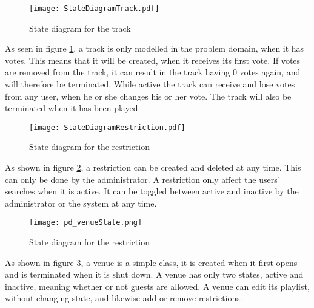\begin{figure}[H]
  \centering
  \texttt{[image: StateDiagramTrack.pdf]}
  \caption{State diagram for the track}\label{fig:StateDiagramTrack}
\end{figure}
As seen in figure \cref{fig:StateDiagramTrack}, a track is only modelled in the problem domain, when it has votes. This means that it will be created, when it receives its first vote. If votes are removed from the track, it can result in the track having 0 votes again, and will therefore be terminated. While active the track can receive and lose votes from any user, when he or she changes his or her vote. The track will also be terminated when it has been played.

\begin{figure}[H]
  \centering
  \texttt{[image: StateDiagramRestriction.pdf]}
  \caption{State diagram for the restriction}\label{fig:StateDiagramRestriction}
\end{figure}
As shown in figure \cref{fig:StateDiagramRestriction}, a restriction can be created and deleted at any time. This can only be done by the administrator. A restriction only affect the users' searches when it is active. It can be toggled between active and inactive by the administrator or the system at any time.

\begin{figure}[H]
  \centering
  \texttt{[image: pd\_venueState.png]}
  \caption{State diagram for the restriction}\label{fig:StateDiagramVenue}
\end{figure}
As shown in figure \cref{fig:StateDiagramVenue}, a venue is a simple class, it is created when it first opens and is terminated when it is shut down. A venue has only two states, active and inactive, meaning whether or not guests are allowed. A venue can edit its playlist, without changing state, and likewise add or remove restrictions.